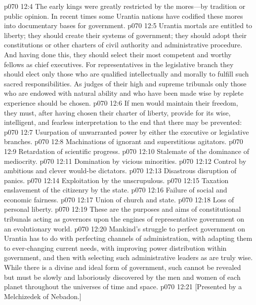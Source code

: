 \vs p070 12:4 The early kings were greatly restricted by the mores---by tradition or public opinion. In recent times some Urantia nations have codified these mores into documentary bases for government.
\pc \vs p070 12:5 Urantia mortals are entitled to liberty; they should create their systems of government; they should adopt their constitutions or other charters of civil authority and administrative procedure. And having done this, they should select their most competent and worthy fellows as chief executives. For representatives in the legislative branch they should elect only those who are qualified intellectually and morally to fulfill such sacred responsibilities. As judges of their high and supreme tribunals only those who are endowed with natural ability and who have been made wise by replete experience should be chosen.
\vs p070 12:6 If men would maintain their freedom, they must, after having chosen their charter of liberty, provide for its wise, intelligent, and fearless interpretation to the end that there may be prevented:
\pc \vs p070 12:7 \bibnobreakspace Usurpation of unwarranted power by either the executive or legislative branches.
\vs p070 12:8 \bibnobreakspace Machinations of ignorant and superstitious agitators.
\vs p070 12:9 \bibnobreakspace Retardation of scientific progress.
\vs p070 12:10 \bibnobreakspace Stalemate of the dominance of mediocrity.
\vs p070 12:11 \bibnobreakspace Domination by vicious minorities.
\vs p070 12:12 \bibnobreakspace Control by ambitious and clever would\hyp{}be dictators.
\vs p070 12:13 \bibnobreakspace Disastrous disruption of panics.
\vs p070 12:14 \bibnobreakspace Exploitation by the unscrupulous.
\vs p070 12:15 \bibnobreakspace Taxation enslavement of the citizenry by the state.
\vs p070 12:16 \bibnobreakspace Failure of social and economic fairness.
\vs p070 12:17 \bibnobreakspace Union of church and state.
\vs p070 12:18 \bibnobreakspace Loss of personal liberty.
\pc \vs p070 12:19 These are the purposes and aims of constitutional tribunals acting as governors upon the engines of representative government on an evolutionary world.
\vs p070 12:20 Mankind’s struggle to perfect government on Urantia has to do with perfecting channels of administration, with adapting them to ever\hyp{}changing current needs, with improving power distribution within government, and then with selecting such administrative leaders as are truly wise. While there is a divine and ideal form of government, such cannot be revealed but must be slowly and laboriously discovered by the men and women of each planet throughout the universes of time and space.
\vsetoff
\vs p070 12:21 [Presented by a Melchizedek of Nebadon.]

